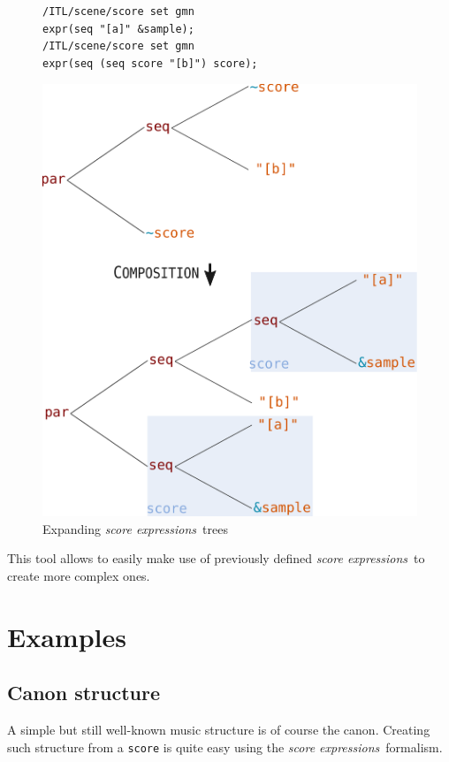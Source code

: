 \documentclass{article}
\newcommand{\OSC}[1]{\texttt{#1}}
\newcommand{\oper}[1]{\textcolor{figRed}{#1}}
\newcommand{\param}[1]{\textcolor{figOrange}{#1}}
\newcommand{\prefix}[1]{\textcolor{figBlue}{#1}}
\newcommand{\sExpr}{\emph{score expressions}}
\newcommand{\lowTilde}{\texttildelow}
\newcommand{\tab}{\hspace*{4mm}}
\newcommand{\sample}	[1]			{\vspace{-0.2em}\begin{center}\colorbox{mygrey}{\begin{minipage}[t]{0.95\columnwidth} {\small \texttt{#1}}\end{minipage}}\end{center}}
\begin{document}
\begin{figure}[th]

\sample{/ITL/scene/score set gmn\\
\tab expr(\oper{seq} \param{"[a]"} \prefix{\&}\param{sample});\\
/ITL/scene/score set gmn  \\
\tab expr(\oper{seq} (\oper{seq} \prefix{\lowTilde}\param{score} \param{"[b]"}) \prefix{\lowTilde}\param{score});
}

\centering
\includegraphics[width=0.9\columnwidth]{imgs/expandingTree}
\caption{Expanding \sExpr\ trees
\label{fig:expandingTree}}
\end{figure}

This tool allows to easily make use of previously defined \sExpr\ to create more complex ones.
\section{Examples}
\label{examples}

\subsection{Canon structure}

A simple but still well-known music structure is of course the canon. Creating such structure from a \OSC{score} is quite easy using the \sExpr\ formalism.
\end{document}
